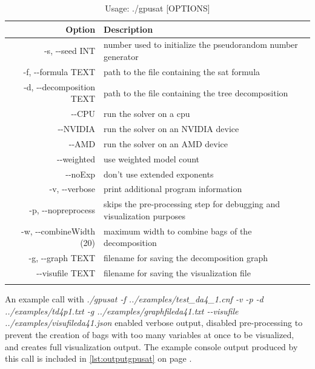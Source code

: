 \documentclass[a4paper, 12pt, bibliography=totoc]{scrartcl}
\begin{document}
\begin{longtable}{|r|p{10cm}|}
	\hline
	Option & Description\\
	\hline\hline

	\endhead
	
-s, -{}-seed INT&  number used to initialize the pseudorandom number generator\\\hline
	-f, -{}-formula TEXT &  path to the file containing the sat formula\\\hline
	-d, -{}-decomposition TEXT  &   path to the file containing the tree decomposition\\\hline
	-{}-CPU                   &    run the solver on a cpu\\\hline
	-{}-NVIDIA                &    run the solver on an NVIDIA device\\\hline
	-{}-AMD                   &    run the solver on an AMD device\\\hline
	-{}-weighted              &   use weighted model count\\\hline
	-{}-noExp                 &    don't use extended exponents\\\hline
	-v, -{}-verbose            &    print additional program information\\\hline
	-p, -{}-nopreprocess       &    skips the pre-processing step for debugging and visualization purposes\\\hline
	-w, -{}-combineWidth (20) &    maximum width to combine bags of the decomposition\\\hline
	-g, -{}-graph TEXT        &    filename for saving the decomposition graph\\\hline
	-{}-visufile TEXT         &    filename for saving the visualization file\\\hline
	\hline
	\caption{Usage: ./gpusat [OPTIONS]
		\label{tab:optionsgpusat}}
\end{longtable}      
        
An example call with \textit{./gpusat -f ../examples/test\_da4\_1.cnf -v -p -d ../examples/td4p1.txt  -g ../examples/graphfileda41.txt -{}-visufile ../examples/visufileda41.json} enabled verbose output, disabled pre-processing to prevent the creation of bags with too many variables at once to be visualized, and creates full visualization output. 
The example console output produced by this call is included in \ref{lst:outputgpusat} on page \pageref{lst:outputgpusat}.
\end{document}
